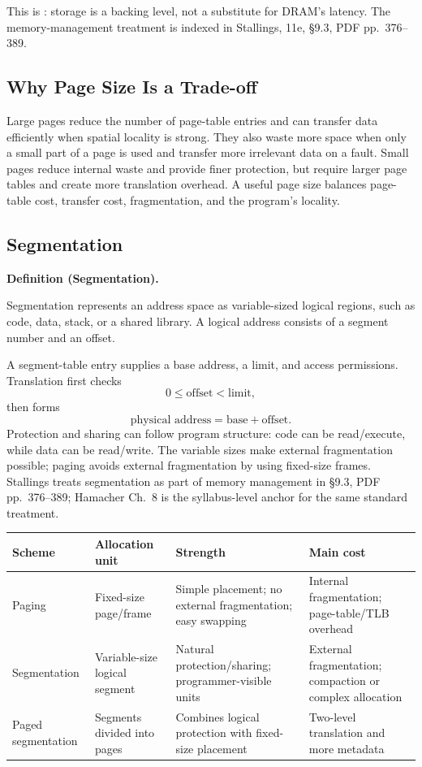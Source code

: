\documentclass[11pt]{article}
\newenvironment{definitionbox}[1]{%
  \par\noindent\textbf{Definition (#1).}\ \itshape
}{\par\vspace{0.3em}}
\begin{document}
This is : storage is a backing level, not a substitute for
DRAM's latency. The memory-management treatment is indexed in Stallings,
11e, \S9.3, PDF pp.~376--389.

\subsection{Why Page Size Is a Trade-off}

Large pages reduce the number of page-table entries and can transfer data
efficiently when spatial locality is strong. They also waste more space when
only a small part of a page is used and transfer more irrelevant data on a
fault. Small pages reduce internal waste and provide finer protection, but
require larger page tables and create more translation overhead. A useful page
size balances page-table cost, transfer cost, fragmentation, and the program's
locality.

\subsection{Segmentation}

\begin{definitionbox}{Segmentation}
Segmentation represents an address space as variable-sized logical regions,
such as code, data, stack, or a shared library. A logical address consists of
a segment number and an offset.
\end{definitionbox}

A segment-table entry supplies a base address, a limit, and access permissions.
Translation first checks
\[
  0\leq\text{offset}<\text{limit},
\]
then forms
\[
  \text{physical address}=\text{base}+\text{offset}.
\]
Protection and sharing can follow program structure: code can be read/execute,
while data can be read/write. The variable sizes make external fragmentation
possible; paging avoids external fragmentation by using fixed-size frames.
Stallings treats segmentation as part of memory management in \S9.3, PDF
pp.~376--389; Hamacher Ch.~8 is the syllabus-level anchor for the same
standard treatment.

\begin{center}
\footnotesize
\begin{tabular}{@{}>{\raggedright\arraybackslash}p{2.2cm}>{\raggedright\arraybackslash}p{3.6cm}>{\raggedright\arraybackslash}p{3.6cm}>{\raggedright\arraybackslash}p{2.8cm}@{}}
\toprule
\textbf{Scheme} & \textbf{Allocation unit} & \textbf{Strength} & \textbf{Main cost} \\
\midrule
Paging & Fixed-size page/frame & Simple placement; no external fragmentation; easy swapping & Internal fragmentation; page-table/TLB overhead \\
Segmentation & Variable-size logical segment & Natural protection/sharing; programmer-visible units & External fragmentation; compaction or complex allocation \\
Paged segmentation & Segments divided into pages & Combines logical protection with fixed-size placement & Two-level translation and more metadata \\
\bottomrule
\end{tabular}
\end{center}
\end{document}
